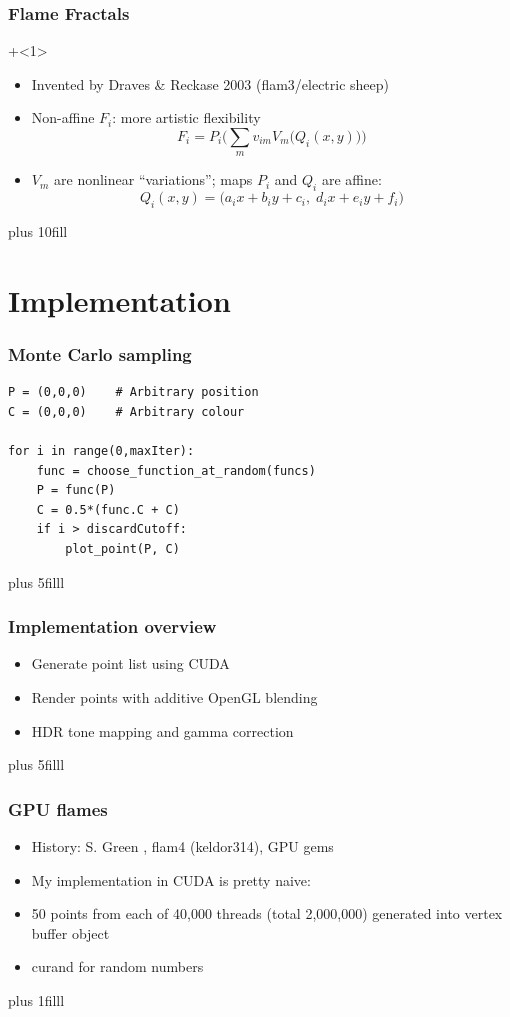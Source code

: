 \documentclass{beamer}
\newcommand{\vf}[1]{\vskip0pt plus #1}
\begin{document}
\begin{frame}
  \frametitle{Flame Fractals}
  \onslide+<1>
  \begin{itemize}
    \item
      Invented by Draves \& Reckase 2003 \cite{Draves2003} (flam3/electric sheep)
    \item
      Non-affine $F_i$: more artistic flexibility
      \[
      F_i = P_i\bigg(\sum_m v_{im} V_m\big(Q_i(x,y)\big)\bigg)
      \]
    \item
      $V_m$ are nonlinear ``variations''; maps $P_i$ and $Q_i$ are affine:
      \[
        Q_i(x,y) = \big(a_i x + b_i y + c_i,\; d_i x + e_i y + f_i \big)
      \]
  \end{itemize}
  \vf{10fill}
\end{frame}


\section{Implementation}

\begin{frame}[fragile]
  \frametitle{Monte Carlo sampling}
  \lstset{language=python,basicstyle=\scriptsize}
\begin{lstlisting}
P = (0,0,0)    # Arbitrary position
C = (0,0,0)    # Arbitrary colour

for i in range(0,maxIter):
    func = choose_function_at_random(funcs)
    P = func(P)
    C = 0.5*(func.C + C)
    if i > discardCutoff:
        plot_point(P, C)
\end{lstlisting}
  \vf{5filll}
\end{frame}


\begin{frame}
  \frametitle{Implementation overview}
  \begin{itemize}
    \item
      Generate point list using CUDA
    \item
      Render points with additive OpenGL blending
    \item
      HDR tone mapping and gamma correction
  \end{itemize}
  \vf{5filll}
\end{frame}


\begin{frame}
  \frametitle{GPU flames}
  \begin{itemize}
    \item
      History: S. Green \cite{Green2005}, flam4 (keldor314), GPU gems \cite{Schied2011}
    \item
      My implementation in CUDA is pretty naive:
    \item
      50 points from each of 40,000 threads (total 2,000,000) generated into 
      vertex buffer object
    \item
      curand for random numbers
  \end{itemize}
  \vf{1filll}
\end{frame}
\end{document}
